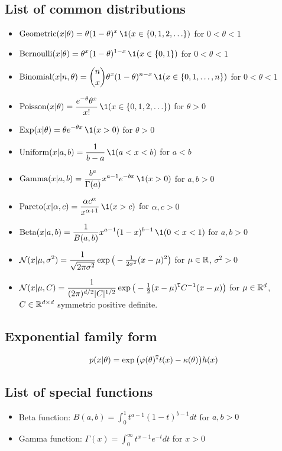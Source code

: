 \documentclass[12pt]{article}
\begin{document}
\newpage
\subsection*{List of common distributions}
\begin{itemize}
    \setlength\itemsep{1em}
    \item[] $\displaystyle \Geometric(x|\theta) = \theta(1-\theta)^x\,\1(x\in\{0,1,2,\ldots\})$ for $0<\theta<1$
    \item[] $\displaystyle \Bernoulli(x|\theta) = \theta^x(1-\theta)^{1-x}\,\1(x\in\{0,1\})$ for $0<\theta<1$
    \item[] $\displaystyle \Binomial(x|n,\theta) = {n\choose x}\theta^x(1-\theta)^{n-x}\,\1(x\in\{0,1,\ldots,n\})$ for $0<\theta<1$
    \item[] $\displaystyle \Poisson(x|\theta) = \frac{e^{-\theta}\theta^x}{x!}\,\1(x\in\{0,1,2,\ldots\})$ for $\theta>0$
    \item[] $\displaystyle \Exp(x|\theta) = \theta e^{-\theta x}\,\1(x>0)$ for $\theta>0$
    \item[] $\displaystyle \Uniform(x|a,b) = \frac{1}{b-a}\,\1(a<x<b)$ for $a<b$
    \item[] $\displaystyle \Ga(x|a,b) = \frac{b^a}{\Gamma(a)}x^{a-1}e^{-b x}\,\1(x>0)$ for $a,b>0$
    \item[] $\displaystyle \Pareto(x|\alpha,c) = \frac{\alpha c^\alpha}{x^{\alpha+1}}\,\1(x>c)$ for $\alpha,c>0$
    \item[] $\displaystyle \Beta(x|a,b) = \frac{1}{B(a,b)}x^{a-1}(1-x)^{b-1}\,\1(0<x<1)$ for $a,b>0$
    \item[] $\displaystyle \mathcal{N}(x|\mu,\sigma^2) = \frac{1}{\sqrt{2\pi\sigma^2}}\exp\big(-\tfrac{1}{2\sigma^2}(x-\mu)^2\big)$
        for $\mu\in\mathbb{R}$, $\sigma^2>0$
    \item[] $\displaystyle \mathcal{N}(x|\mu,C) = \frac{1}{(2\pi)^{d/2}|C|^{1/2}}\exp\big(-\tfrac{1}{2}(x-\mu)^{\mathtt{T}} C^{-1} (x-\mu)\big)$
        for $\mu\in\mathbb{R}^d$, $C\in\mathbb{R}^{d\times d}$ symmetric positive definite.
\end{itemize}

\subsection*{Exponential family form}
$$ p(x|\theta) =\exp\big(\varphi(\theta)^{\mathtt{T}} t(x)-\kappa(\theta)\big) h(x) $$

\subsection*{List of special functions}
\label{special-functions}
\begin{itemize}
    \setlength\itemsep{1em}
    \item[] Beta function: $\displaystyle B(a,b) = \int_0^1 t^{a-1}(1-t)^{b-1} d t$ for $a,b>0$
    \item[] Gamma function: $\displaystyle \Gamma(x) = \int_0^\infty t^{x-1} e^{-t} d t$ for $x>0$
\end{itemize}
\end{document}
